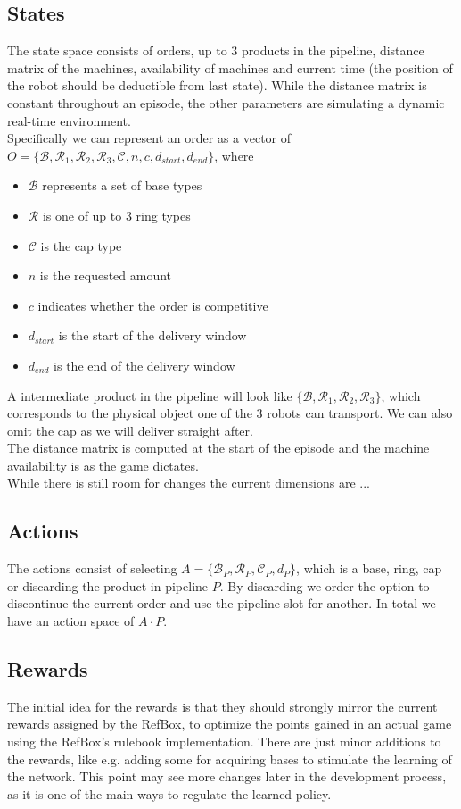 \documentclass[runningheads,envcountsect]{llncs}
\begin{document}
\subsection{States} \label{states}
The state space consists of orders, up to 3 products in the pipeline, distance matrix of the machines, availability of machines and current time (the position of the robot should be deductible from last state). While the distance matrix is constant throughout an episode, the other parameters are simulating a dynamic real-time environment.\\
Specifically we can represent an order as a vector of $O=\{\mathcal{B}, \mathcal{R}_1, \mathcal{R}_2, \mathcal{R}_3, \mathcal{C}, n, c, d_{start}, d_{end}  \}$, where
\begin{itemize}
  \item $\mathcal{B}$ represents a set of base types
  \item $\mathcal{R}$ is one of up to 3 ring types
  \item $\mathcal{C}$ is the cap type
  \item $n$ is the requested amount
  \item $c$ indicates whether the order is competitive
  \item $d_{start}$ is the start of the delivery window
  \item $d_{end}$ is the end of the delivery window
\end{itemize}
A intermediate product in the pipeline will look like $\{\mathcal{B}, \mathcal{R}_1, \mathcal{R}_2, \mathcal{R}_3\}$, which corresponds to the physical object one of the 3 robots can transport. We can also omit the cap as we will deliver straight after.\\
The distance matrix is computed at the start of the episode and the machine availability is as the game dictates.\\
While there is still room for changes the current dimensions are ...


\subsection{Actions}
The actions consist of selecting $A=\{\mathcal{B}_P, \mathcal{R}_P, \mathcal{C}_P, d_P\}$, which is a base, ring, cap or discarding the product in pipeline $P$. By discarding we order the option to discontinue the current order and use the pipeline slot for another. In total we have an action space of $A\cdot P$.


\subsection{Rewards}
The initial idea for the rewards is that they should strongly mirror the current rewards assigned by the RefBox, to optimize the points gained in an actual game using the RefBox's rulebook implementation. There are just minor additions to the rewards, like e.g. adding some for acquiring bases to stimulate the learning of the network. This point may see more changes later in the development process, as it is one of the main ways to regulate the learned policy.
\end{document}
